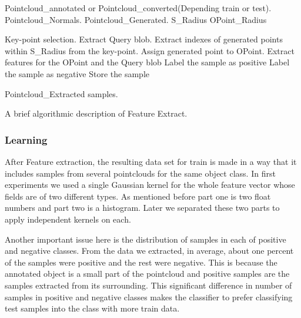 \begin{algorithm}[t]
\begin{algorithmic}[1]
\REQUIRE Pointcloud\_annotated or Pointcloud\_converted(Depending train or test).
\REQUIRE Pointcloud\_Normals.
\REQUIRE Pointcloud\_Generated.
\REQUIRE S\_Radius
\REQUIRE OPoint\_Radius
\medskip

\STATE Key-point selection.
  \STATE Extract Query blob.
  \STATE Extract indexes of generated points within S\_Radius from the key-point.
    \STATE Assign generated point to OPoint.
    \STATE Extract features for the OPoint and the Query blob
	\STATE Label the sample as positive
      \ELSE
	\STATE Label the sample as negative
      \ENDIF
     \ENDIF
   \ENDFOR
     \STATE Store the sample
\ENDFOR

\medskip
\ENSURE Pointcloud\_Extracted samples.
\end{algorithmic}
\caption[Feature Extract.]
{A brief algorithmic description of Feature Extract.}
\label{FeatureEXtract.algorithm}
\end{algorithm}

\subsubsection{Learning}
\label{Learning.ssec}

After Feature extraction, the resulting data set for train is made in a way that it includes samples from several pointclouds 
for the same object class. 
In first experiments we used a single Gaussian kernel for the whole feature vector whose fields are of two different types. 
As mentioned before part one is two float numbers and part two is a histogram. 
Later we separated these two parts to apply independent kernels on each. 

Another important issue here is the distribution of samples in each of positive and negative classes. 
From the data we extracted, in average, about one percent of the samples were positive and the rest were negative.
This is because the annotated object is a small part of the pointcloud and positive samples are the samples extracted from its 
surrounding. 
This significant difference in number of samples in positive and negative classes makes the classifier to prefer classifying test samples into 
the class with more train data.

